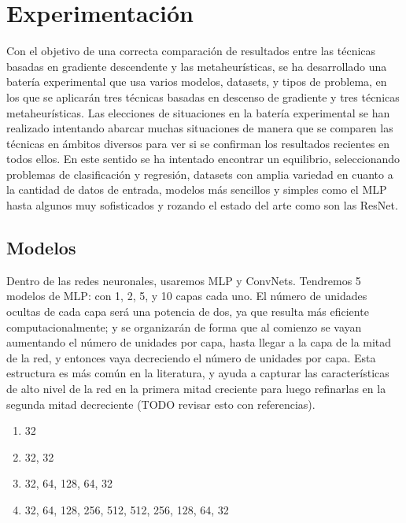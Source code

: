 \section{Experimentación}

Con el objetivo de una correcta comparación de resultados entre las técnicas basadas en gradiente descendente y las metaheurísticas, se ha desarrollado una batería experimental que usa varios modelos, datasets, y tipos de problema, en los que se aplicarán tres técnicas basadas en descenso de gradiente y tres técnicas metaheurísticas. Las elecciones de situaciones en la batería experimental se han realizado intentando abarcar muchas situaciones de manera que se comparen las técnicas en ámbitos diversos para ver si se confirman los resultados recientes en todos ellos. En este sentido se ha intentado encontrar un equilibrio, seleccionando problemas de clasificación y regresión, datasets con amplia variedad en cuanto a la cantidad de datos de entrada, modelos más sencillos y simples como el MLP hasta algunos muy sofisticados y rozando el estado del arte como son las ResNet.

\subsection{Modelos}

Dentro de las redes neuronales, usaremos MLP y ConvNets. Tendremos 5 modelos de MLP: con 1, 2, 5, y 10 capas cada uno. El número de unidades ocultas de cada capa será una potencia de dos, ya que resulta más eficiente computacionalmente; y se organizarán de forma que al comienzo se vayan aumentando el número de unidades por capa, hasta llegar a la capa de la mitad de la red, y entonces vaya decreciendo el número de unidades por capa. Esta estructura es más común en la literatura, y ayuda a capturar las características de alto nivel de la red en la primera mitad creciente para luego refinarlas en la segunda mitad decreciente (TODO revisar esto con referencias). 

\begin{enumerate}
    \item 32 

    \item 32, 32

    \item 32, 64, 128, 64, 32

    \item 32, 64, 128, 256, 512, 512, 256, 128, 64, 32
\end{enumerate}


